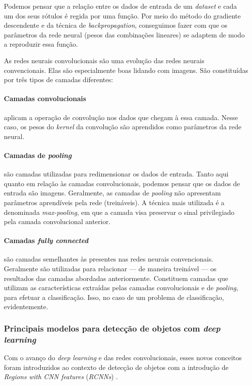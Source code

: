 Podemos pensar que a relação entre os dados de entrada de um \emph{dataset} e cada um dos seus rótulos é regida por uma função. Por meio do método do gradiente descendente e da técnica de \emph{backpropagation}, conseguimos fazer com que os parâmetros da rede neural (pesos das combinações lineares) se adaptem de modo a reproduzir essa função.

As redes neurais convolucionais são uma evolução das redes neurais convencionais. Elas são especialmente boas lidando com imagens. São constituídas por três tipos de camadas diferentes:

\paragraph{Camadas convolucionais} aplicam a operação de convolução nos dados que chegam à essa camada. Nesse caso, os pesos do \emph{kernel} da convolução são aprendidos como parâmetros da rede neural.

\paragraph{Camadas de \emph{pooling}} são camadas utilizadas para redimensionar os dados de entrada. Tanto aqui quanto em relação às camadas convolucionais, podemos pensar que os dados de entrada são imagens. Geralmente, as camadas de \emph{pooling} não apresentam parâmetros aprendíveis pela rede (treináveis). A técnica mais utilizada é a denominada \emph{max-pooling}, em que a camada visa preservar o sinal privilegiado pela camada convolucional anterior.

\paragraph{Camadas \emph{fully connected}} são camadas semelhantes às presentes nas redes neurais convencionais. Geralmente são utilizadas para relacionar --- de maneira treinável --- os resultados das camadas abordadas anteriormente. Constituem camadas que utilizam as características extraídas pelas camadas convolucionais e de \emph{pooling}, para efetuar a classificação. Isso, no caso de um problema de classificação, evidentemente.

\subsubsection{Principais modelos para detecção de objetos com \emph{deep learning}}
Com o avanço do \emph{deep learning} e das redes convolucionais, esses novos conceitos foram introduzidos ao contexto de detecção de objetos com a introdução de \emph{Regions with CNN features} (\emph{RCNNs}) \citep{Zou2019Object, rcnn1, rcnn2}.

